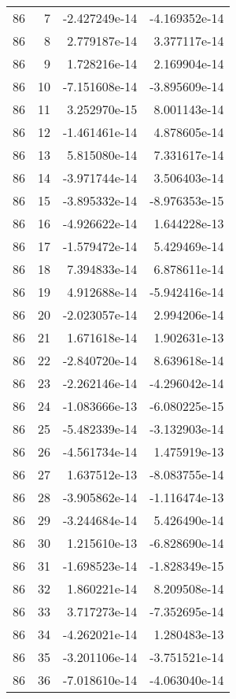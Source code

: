 \begin{tabular}{rrrr}
  86 &    7 & -2.427249e-14 & -4.169352e-14 \\
  86 &    8 &  2.779187e-14 &  3.377117e-14 \\
  86 &    9 &  1.728216e-14 &  2.169904e-14 \\
  86 &   10 & -7.151608e-14 & -3.895609e-14 \\
  86 &   11 &  3.252970e-15 &  8.001143e-14 \\
  86 &   12 & -1.461461e-14 &  4.878605e-14 \\
  86 &   13 &  5.815080e-14 &  7.331617e-14 \\
  86 &   14 & -3.971744e-14 &  3.506403e-14 \\
  86 &   15 & -3.895332e-14 & -8.976353e-15 \\
  86 &   16 & -4.926622e-14 &  1.644228e-13 \\
  86 &   17 & -1.579472e-14 &  5.429469e-14 \\
  86 &   18 &  7.394833e-14 &  6.878611e-14 \\
  86 &   19 &  4.912688e-14 & -5.942416e-14 \\
  86 &   20 & -2.023057e-14 &  2.994206e-14 \\
  86 &   21 &  1.671618e-14 &  1.902631e-13 \\
  86 &   22 & -2.840720e-14 &  8.639618e-14 \\
  86 &   23 & -2.262146e-14 & -4.296042e-14 \\
  86 &   24 & -1.083666e-13 & -6.080225e-15 \\
  86 &   25 & -5.482339e-14 & -3.132903e-14 \\
  86 &   26 & -4.561734e-14 &  1.475919e-13 \\
  86 &   27 &  1.637512e-13 & -8.083755e-14 \\
  86 &   28 & -3.905862e-14 & -1.116474e-13 \\
  86 &   29 & -3.244684e-14 &  5.426490e-14 \\
  86 &   30 &  1.215610e-13 & -6.828690e-14 \\
  86 &   31 & -1.698523e-14 & -1.828349e-15 \\
  86 &   32 &  1.860221e-14 &  8.209508e-14 \\
  86 &   33 &  3.717273e-14 & -7.352695e-14 \\
  86 &   34 & -4.262021e-14 &  1.280483e-13 \\
  86 &   35 & -3.201106e-14 & -3.751521e-14 \\
  86 &   36 & -7.018610e-14 & -4.063040e-14 \\

\end{tabular}
